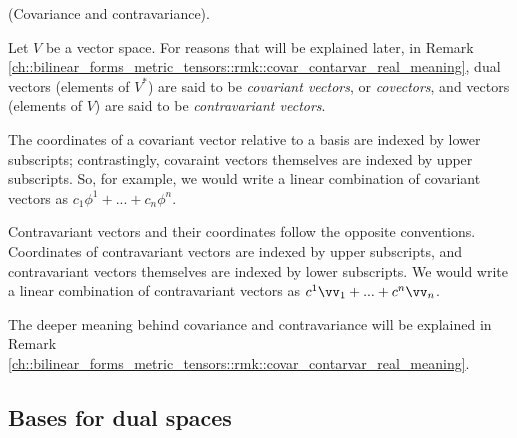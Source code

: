\begin{defn}
\label{ch::motivated_intro::defn::covariance_contravariance}
    (Covariance and contravariance).
    
    Let $V$ be a vector space. For reasons that will be explained later, in Remark \ref{ch::bilinear_forms_metric_tensors::rmk::covar_contarvar_real_meaning}, dual vectors (elements of $V^*$) are said to be \textit{covariant vectors}, or \textit{covectors}, and vectors (elements of $V$) are said to be \textit{contravariant vectors}.
    
    The coordinates of a covariant vector relative to a basis are indexed by lower subscripts; contrastingly, covaraint vectors themselves are indexed by upper subscripts. So, for example, we would write a linear combination of covariant vectors as $c_1 \phi^1 + ... + c_n \phi^n$.
    
    Contravariant vectors and their coordinates follow the opposite conventions. Coordinates of contravariant vectors are indexed by upper subscripts, and contravariant vectors themselves are indexed by lower subscripts. We would write a linear combination of contravariant vectors as $c^1 \vv_1 + ... + c^n \vv_n$.
    
    The deeper meaning behind covariance and contravariance will be explained in Remark \ref{ch::bilinear_forms_metric_tensors::rmk::covar_contarvar_real_meaning}.
\end{defn}

\subsection*{Bases for dual spaces}

